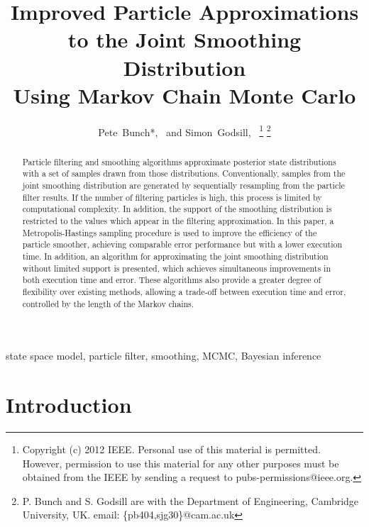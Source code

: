 \documentclass[10pt,twocolumn,twoside]{IEEEtran}
\begin{document}
\title{Improved Particle Approximations \\ to the Joint Smoothing Distribution \\ Using Markov Chain Monte Carlo}

\author{Pete~Bunch*,~ and
        Simon~Godsill,~%
\thanks{Copyright (c) 2012 IEEE. Personal use of this material is permitted. However, permission to use this material for any other purposes must be obtained from the IEEE by sending a request to pubs-permissions@ieee.org.}
\thanks{P. Bunch and S. Godsill are with the Department
of Engineering, Cambridge University, UK. email: \{pb404,sjg30\}@cam.ac.uk}%
}

\maketitle

\begin{abstract}
Particle filtering and smoothing algorithms approximate posterior state distributions with a set of samples drawn from those distributions. Conventionally, samples from the joint smoothing distribution are generated by sequentially resampling from the particle filter results. If the number of filtering particles is high, this process is limited by computational complexity. In addition, the support of the smoothing distribution is restricted to the values which appear in the filtering approximation. In this paper, a Metropolis-Hastings sampling procedure is used to improve the efficiency of the particle smoother, achieving comparable error performance but with a lower execution time. In addition, an algorithm for approximating the joint smoothing distribution without limited support is presented, which achieves simultaneous improvements in both execution time and error. These algorithms also provide a greater degree of flexibility over existing methods, allowing a trade-off between execution time and error, controlled by the length of the Markov chains.
\end{abstract}

\begin{IEEEkeywords}
state space model, particle filter, smoothing, MCMC, Bayesian inference
\end{IEEEkeywords}

\section{Introduction} \label{sec:intro}
\end{document}
